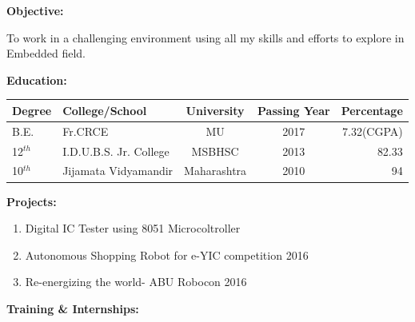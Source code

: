 \documentclass[a4paper]{article}
\begin{document}
	\vspace{-3mm}
 \begin{flushleft}
 	\begin{Large}\textbf{Objective:}\end{Large} \hspace{0.05in} To work in a challenging environment using all my skills and efforts to explore in Embedded field.\\
 	\begin{Large}\vspace{0.3in}\textbf{Education:}\end{Large}
 	\vspace{-3mm}
 	\begin{center}
 	\begin{tabular}{|l|l|c|c|r|}
 	\hline
 	Degree & College/School & University & Passing Year & Percentage\\ \hline
 
 	B.E. & Fr.CRCE & MU & 2017 & 7.32(CGPA)\\ \hline
 
 	12$^{th}$ & I.D.U.B.S. Jr. College & MSBHSC & 2013 & 82.33\\ \hline
 
	10$^{th}$ & Jijamata Vidyamandir & Maharashtra & 2010 & 94\\ \hline

 	\end{tabular}
    \end{center}
    
  
  	\begin{Large}\vspace{0.2in}\textbf{Projects:}\end{Large}
  	\begin{enumerate}
  		\item Digital IC Tester using 8051 Microcoltroller
  		\item Autonomous Shopping Robot for e-YIC competition 2016
  		\item Re-energizing the world- ABU Robocon 2016
  	\end{enumerate}
  	
  
	  	\begin{Large}\vspace{0.2in}\textbf{Training \& Internships:}\end{Large}\\
	  	\begin{itemize}
	  		

\end{itemize}
\end{flushleft}
\end{document}
